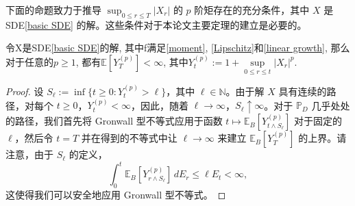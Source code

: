 下面的命题致力于推导 \( \sup_{0 \leq r \leq T} |X_r| \) 的 \( p \) 阶矩存在的充分条件，其中 \( X \) 是 SDE\cref{basic SDE} 的解。这些条件对于本论文主要定理的建立是必要的。
\begin{proposition}\label{main pro}
	令X是SDE\cref{basic SDE}的解, 其中f满足\cref{moment}, \cref{Lipschitz}和\cref{linear growth}, 那么对于任意的$p \ge 1$, 都有$\mathbb{E}[Y_T^{(p)}] < \infty$, 其中$Y_t^{(p)} := 1 + \sup\limits_{0\le r\le t}|X_r|^p$.
\end{proposition}
\begin{proof}
	设 $S_{\ell} := \inf\{ t \geq 0 : Y_{t}^{(p)} > \ell \}$，其中 $\ell \in \mathbb{N}$。由于解 $X$ 具有连续的路径，对每个 $t \geq 0$，$Y_{t}^{(p)} < \infty$，因此，随着 $\ell \to \infty$，$S_{\ell} \uparrow \infty$。对于 $\mathbb{P}_D$ 几乎处处的路径，我们首先将 Gronwall 型不等式应用于函数 $t \mapsto \mathbb{E}_B[Y_{t \wedge S_{\ell}}^{(p)}]$ 对于固定的 $\ell$，然后令 $t = T$ 并在得到的不等式中让 $\ell \to \infty$ 来建立 $\mathbb{E}_B[Y_T^{(p)}]$ 的上界。请注意，由于 $S_{\ell}$ 的定义，
	\[
	\int_{0}^{t} \mathbb{E}_B[Y_{r \wedge S_{\ell}}^{(p)}] \, dE_r \leq \ell E_t < \infty,
	\]
	这使得我们可以安全地应用 Gronwall 型不等式。
	

\end{proof}
